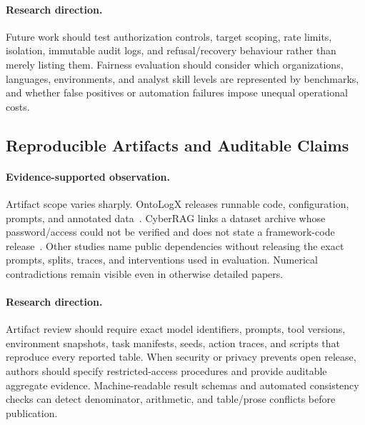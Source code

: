 \paragraph{Research direction.}
Future work should test authorization controls, target scoping, rate limits, isolation, immutable audit logs, and refusal/recovery behaviour rather than merely listing them. Fairness evaluation should consider which organizations, languages, environments, and analyst skill levels are represented by benchmarks, and whether false positives or automation failures impose unequal operational costs.

\subsection{Reproducible Artifacts and Auditable Claims}

\paragraph{Evidence-supported observation.}
Artifact scope varies sharply. OntoLogX releases runnable code, configuration, prompts, and annotated data~\cite{R0365_Cotti_2026}. CyberRAG links a dataset archive whose password/access could not be verified and does not state a framework-code release~\cite{R0447_Blefari_2026}. Other studies name public dependencies without releasing the exact prompts, splits, traces, and interventions used in evaluation. Numerical contradictions remain visible even in otherwise detailed papers.

\paragraph{Research direction.}
Artifact review should require exact model identifiers, prompts, tool versions, environment snapshots, task manifests, seeds, action traces, and scripts that reproduce every reported table. When security or privacy prevents open release, authors should specify restricted-access procedures and provide auditable aggregate evidence. Machine-readable result schemas and automated consistency checks can detect denominator, arithmetic, and table/prose conflicts before publication.
